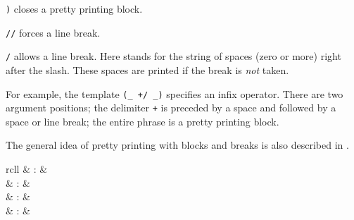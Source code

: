 \begin{isabellebody}
\begin{isamarkuptext}
\begin{description}
  \item \verb|)| closes a pretty printing block.

  \item \verb|//| forces a line break.

  \item \verb|/| allows a line break.  Here 
  stands for the string of spaces (zero or more) right after the
  slash.  These spaces are printed if the break is \emph{not} taken.

  \end{description}

  For example, the template \verb|(_ +/ _)| specifies an infix
  operator.  There are two argument positions; the delimiter
  \verb|+| is preceded by a space and followed by a space or
  line break; the entire phrase is a pretty printing block.

  The general idea of pretty printing with blocks and breaks is also
  described in \cite{paulson-ml2}.%
\end{isamarkuptext}%
\isamarkuptrue%
%
\isamarkuptrue%
%
\begin{isamarkuptext}%
\begin{matharray}{rcll}
    \hypertarget{command.type-notation}{\hyperlink{command.type-notation}{\mbox{}}} & : &  \\
    \hypertarget{command.no-type-notation}{\hyperlink{command.no-type-notation}{\mbox{}}} & : &  \\
    \hypertarget{command.notation}{\hyperlink{command.notation}{\mbox{}}} & : &  \\
    \hypertarget{command.no-notation}{\hyperlink{command.no-notation}{\mbox{}}} & : &  \\
  \end{matharray}


\end{isamarkuptext}
\end{isabellebody}
